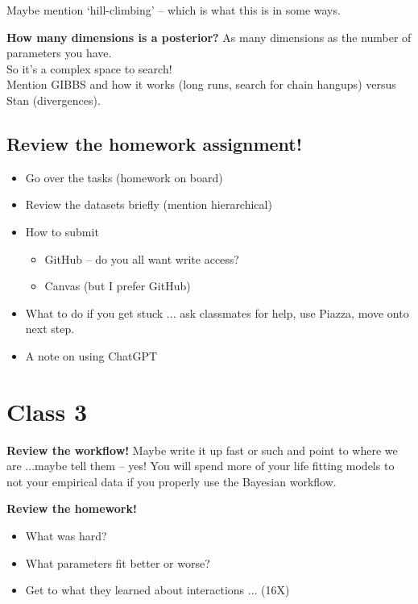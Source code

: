 \documentclass[11pt]{article}
\begin{document}
Maybe mention `hill-climbing' -- which is what this is in some ways. 

{\bf How many dimensions is a posterior?} As many dimensions as the number of parameters you have. \\
So it's a complex space to search! \\
Mention GIBBS and how it works (long runs, search for chain hangups) versus Stan (divergences).\\ 





\subsection{Review the homework assignment!}
\begin{itemize}
\item Go over the tasks (homework on board)
\item Review the datasets briefly (mention hierarchical)
\item How to submit
\begin{itemize}
\item GitHub -- do you all want write access?
\item Canvas (but I prefer GitHub)
\end{itemize}
\item What to do if you get stuck ... ask classmates for help, use Piazza, move onto next step. 
\item A note on using ChatGPT
\end{itemize}

\newpage
\section{Class 3} 

{\bf Review the workflow!} Maybe write it up fast or such and point to where we are ...maybe tell them -- yes! You will spend more of your life fitting models to not your empirical data if you properly use the Bayesian workflow.

{\bf Review the homework!} 
\begin{itemize}
\item What was hard? 
\item What parameters fit better or worse? 
\item Get to what they learned about interactions ... (16X)
\end{itemize}
\end{document}
